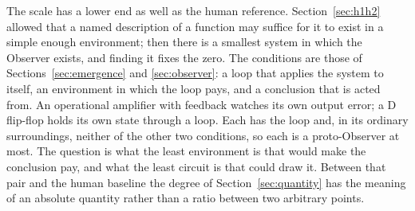 The scale has a lower end as well as the human reference. Section~\ref{sec:h1h2} allowed that a named
description of a function may suffice for it to exist in a simple enough environment; then there is a
smallest system in which the Observer exists, and finding it fixes the zero. The conditions are those
of Sections~\ref{sec:emergence} and \ref{sec:observer}: a loop that applies the system to itself, an
environment in which the loop pays, and a conclusion that is acted from. An operational amplifier with
feedback watches its own output error; a D flip-flop holds its own state through a loop. Each has the
loop and, in its ordinary surroundings, neither of the other two conditions, so each is a
proto-Observer at most. The question is what the least environment is that would make the conclusion
pay, and what the least circuit is that could draw it. Between that pair and the human baseline the
degree of Section~\ref{sec:quantity} has the meaning of an absolute quantity rather than a ratio
between two arbitrary points.
